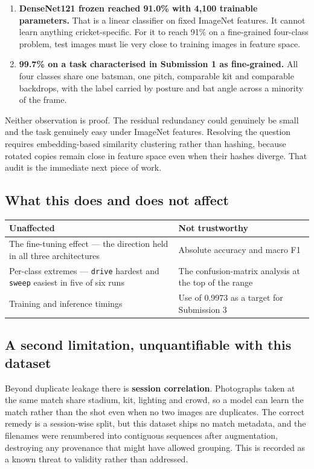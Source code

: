 \documentclass[11pt,a4paper]{article}
\begin{document}
\begin{enumerate}
\item \textbf{DenseNet121 frozen reached 91.0\% with 4{,}100 trainable parameters.} That
  is a linear classifier on fixed ImageNet features. It cannot learn anything
  cricket-specific. For it to reach 91\% on a fine-grained four-class problem, test
  images must lie very close to training images in feature space.
\item \textbf{99.7\% on a task characterised in Submission 1 as fine-grained.} All four
  classes share one batsman, one pitch, comparable kit and comparable backdrops, with the
  label carried by posture and bat angle across a minority of the frame.
\end{enumerate}

Neither observation is proof. The residual redundancy could genuinely be small and the
task genuinely easy under ImageNet features. Resolving the question requires
embedding-based similarity clustering rather than hashing, because rotated copies remain
close in feature space even when their hashes diverge. That audit is the immediate next
piece of work.

\subsection{What this does and does not affect}

\begin{tabularx}{\linewidth}{@{}p{5.4cm}X@{}}
\toprule
\textbf{Unaffected} & \textbf{Not trustworthy} \\
\midrule
The fine-tuning effect --- the direction held in all three architectures &
Absolute accuracy and macro F1 \\
Per-class extremes --- \texttt{drive} hardest and \texttt{sweep} easiest in five of six runs &
The confusion-matrix analysis at the top of the range \\
Training and inference timings &
Use of 0.9973 as a target for Submission 3 \\
\bottomrule
\end{tabularx}

\subsection{A second limitation, unquantifiable with this dataset}

Beyond duplicate leakage there is \textbf{session correlation}. Photographs taken at the
same match share stadium, kit, lighting and crowd, so a model can learn the match rather
than the shot even when no two images are duplicates. The correct remedy is a
session-wise split, but this dataset ships no match metadata, and the filenames were
renumbered into contiguous sequences after augmentation, destroying any provenance that
might have allowed grouping. This is recorded as a known threat to validity rather than
addressed.
\end{document}
